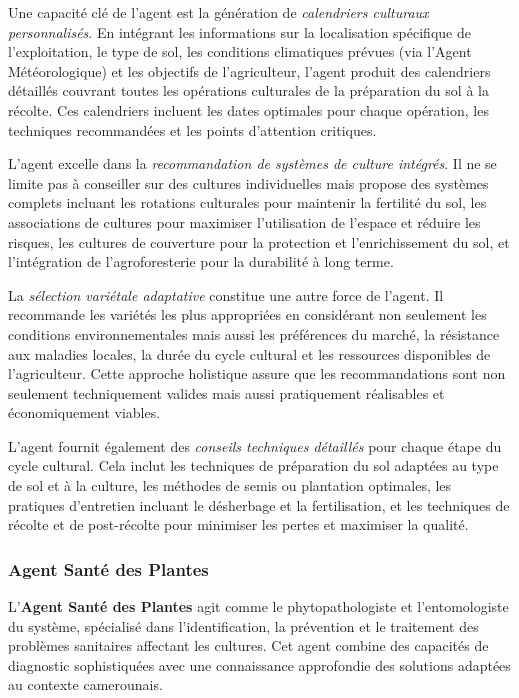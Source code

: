 Une capacité clé de l'agent est la génération de \emph{calendriers culturaux personnalisés}. En intégrant les informations sur la localisation spécifique de l'exploitation, le type de sol, les conditions climatiques prévues (via l'Agent Météorologique) et les objectifs de l'agriculteur, l'agent produit des calendriers détaillés couvrant toutes les opérations culturales de la préparation du sol à la récolte. Ces calendriers incluent les dates optimales pour chaque opération, les techniques recommandées et les points d'attention critiques.

L'agent excelle dans la \emph{recommandation de systèmes de culture intégrés}. Il ne se limite pas à conseiller sur des cultures individuelles mais propose des systèmes complets incluant les rotations culturales pour maintenir la fertilité du sol, les associations de cultures pour maximiser l'utilisation de l'espace et réduire les risques, les cultures de couverture pour la protection et l'enrichissement du sol, et l'intégration de l'agroforesterie pour la durabilité à long terme.

La \emph{sélection variétale adaptative} constitue une autre force de l'agent. Il recommande les variétés les plus appropriées en considérant non seulement les conditions environnementales mais aussi les préférences du marché, la résistance aux maladies locales, la durée du cycle cultural et les ressources disponibles de l'agriculteur. Cette approche holistique assure que les recommandations sont non seulement techniquement valides mais aussi pratiquement réalisables et économiquement viables.

L'agent fournit également des \emph{conseils techniques détaillés} pour chaque étape du cycle cultural. Cela inclut les techniques de préparation du sol adaptées au type de sol et à la culture, les méthodes de semis ou plantation optimales, les pratiques d'entretien incluant le désherbage et la fertilisation, et les techniques de récolte et de post-récolte pour minimiser les pertes et maximiser la qualité.

\subsubsection{Agent Santé des Plantes}

L'\textbf{Agent Santé des Plantes} agit comme le phytopathologiste et l'entomologiste du système, spécialisé dans l'identification, la prévention et le traitement des problèmes sanitaires affectant les cultures. Cet agent combine des capacités de diagnostic sophistiquées avec une connaissance approfondie des solutions adaptées au contexte camerounais.

